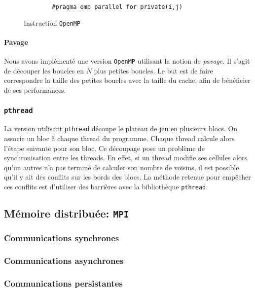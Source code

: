 \begin{figure}[h!]
	\begin{lstlisting}
		#pragma omp parallel for private(i,j)
	\end{lstlisting}
	\caption{Instruction \texttt{OpenMP}}
	\label{omp_parallel}
\end{figure}

\paragraph{Pavage}
Nous avons implémenté une version \texttt{OpenMP} utilisant la notion de \emph{pavage}. Il s'agit de découper les boucles en $N$ plus petites boucles. Le but est de faire correspondre la taille des petites boucles avec la taille du cache, afin de bénéficier de ses performances. 

\subsubsection{\texttt{pthread}}
\label{pthread}

La version utilisant \texttt{pthread} découpe le plateau de jeu en plusieurs blocs. On associe un bloc à chaque thread du programme. Chaque thread calcule alors l'étape suivante pour son bloc. Ce découpage pose un problème de synchronisation entre les threads. En effet, si un thread modifie ses cellules alors qu'un autres n'a pas terminé de calculer son nombre de voisins, il est possible qu'il y ait des conflits sur les bords des blocs. La méthode retenue pour empêcher ces conflits est d'utiliser des barrières avec la bibliothèque \texttt{pthread}.

\subsection{Mémoire distribuée: \texttt{MPI}} %
\label{mpi}


\subsubsection{Communications synchrones}
\subsubsection{Communications asynchrones}
\subsubsection{Communications persistantes}
